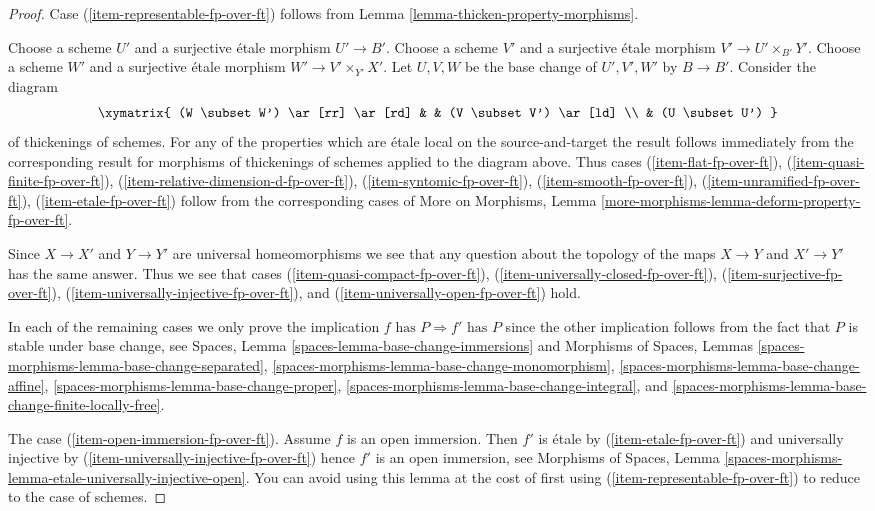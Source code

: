 \begin{proof}
Case (\ref{item-representable-fp-over-ft}) follows from
Lemma \ref{lemma-thicken-property-morphisms}.

\medskip\noindent
Choose a scheme $U'$ and a surjective \'etale morphism $U' \to B'$.
Choose a scheme $V'$ and a surjective \'etale morphism
$V' \to U' \times_{B'} Y'$.
Choose a scheme $W'$ and a surjective \'etale morphism
$W' \to V' \times_{Y'} X'$. Let $U, V, W$ be the base change
of $U', V', W'$ by $B \to B'$. Consider the diagram
$$
\xymatrix{
(W \subset W') \ar[rr] \ar[rd] & & (V \subset V') \ar[ld] \\
& (U \subset U')
}
$$
of thickenings of schemes. For any of the properties which are
\'etale local on the source-and-target the result follows immediately
from the corresponding result for morphisms of thickenings of schemes
applied to the diagram above. Thus cases
(\ref{item-flat-fp-over-ft}),
(\ref{item-quasi-finite-fp-over-ft}),
(\ref{item-relative-dimension-d-fp-over-ft}),
(\ref{item-syntomic-fp-over-ft}),
(\ref{item-smooth-fp-over-ft}),
(\ref{item-unramified-fp-over-ft}),
(\ref{item-etale-fp-over-ft})
follow from the corresponding cases of
More on Morphisms, Lemma \ref{more-morphisms-lemma-deform-property-fp-over-ft}.

\medskip\noindent
Since $X \to X'$ and $Y \to Y'$ are universal homeomorphisms
we see that any question about the topology of the maps
$X \to Y$ and $X' \to Y'$ has the same answer. Thus we see
that cases (\ref{item-quasi-compact-fp-over-ft}),
(\ref{item-universally-closed-fp-over-ft}),
(\ref{item-surjective-fp-over-ft}),
(\ref{item-universally-injective-fp-over-ft}), and
(\ref{item-universally-open-fp-over-ft}) hold.

\medskip\noindent
In each of the remaining cases we only prove the implication
$f\text{ has }P \Rightarrow f'\text{ has }P$ since the other
implication follows from the fact that $P$ is stable under
base change, see
Spaces, Lemma \ref{spaces-lemma-base-change-immersions} and
Morphisms of Spaces, Lemmas
\ref{spaces-morphisms-lemma-base-change-separated},
\ref{spaces-morphisms-lemma-base-change-monomorphism},
\ref{spaces-morphisms-lemma-base-change-affine},
\ref{spaces-morphisms-lemma-base-change-proper},
\ref{spaces-morphisms-lemma-base-change-integral}, and
\ref{spaces-morphisms-lemma-base-change-finite-locally-free}.

\medskip\noindent
The case (\ref{item-open-immersion-fp-over-ft}).
Assume $f$ is an open immersion.
Then $f'$ is \'etale by (\ref{item-etale-fp-over-ft}) and universally injective
by (\ref{item-universally-injective-fp-over-ft})
hence $f'$ is an open immersion, see
Morphisms of Spaces, Lemma
\ref{spaces-morphisms-lemma-etale-universally-injective-open}.
You can avoid using this lemma at the cost of first
using (\ref{item-representable-fp-over-ft}) to reduce to the case of schemes.


\end{proof}
